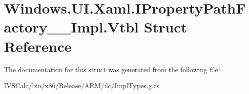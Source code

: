 \hypertarget{struct_windows_1_1_u_i_1_1_xaml_1_1_i_property_path_factory_____impl_1_1_vtbl}{}\section{Windows.\+U\+I.\+Xaml.\+I\+Property\+Path\+Factory\+\_\+\+\_\+\+Impl.\+Vtbl Struct Reference}
\label{struct_windows_1_1_u_i_1_1_xaml_1_1_i_property_path_factory_____impl_1_1_vtbl}


The documentation for this struct was generated from the following file\+:\begin{DoxyCompactItemize}
\item 
I\+V\+S\+Calc/bin/x86/\+Release/\+A\+R\+M/ilc/Impl\+Types.\+g.\+cs\end{DoxyCompactItemize}
